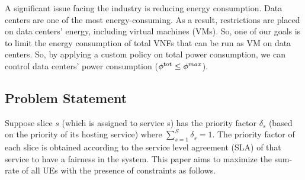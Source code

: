 \documentclass[lettersize,journal]{IEEEtran}
\begin{document}
A significant issue facing the industry is reducing energy consumption. Data centers are one of the most energy-consuming. As a result, restrictions are placed on data centers' energy, including virtual machines (VMs). So, one of our goals is to limit the energy consumption of total VNFs that can be run as VM on data centers. So, by applying a custom policy on total power consumption, we can control data centers' power consumption ($\phi^{\text{\text{tot}}}  \leq \phi^{max}$).
\subsection{Problem Statement}
Suppose slice $s$ (which is assigned to service s) has the priority factor $\delta_s$ (based on the priority of its hosting service) where $\sum_{s=1}^S \delta_s =1$.
The priority factor of each slice is obtained according to the service level agreement (SLA) of that service to have a fairness in the system.
This paper aims to maximize the sum-rate of all UEs with the presence of constraints as follows. %
\end{document}

